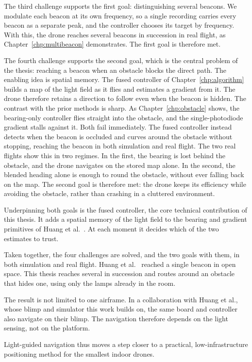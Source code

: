 The third challenge supports the first goal: distinguishing several beacons. We modulate each beacon at its own frequency, so a single recording carries every beacon as a separate peak, and the controller chooses its target by frequency. With this, the drone reaches several beacons in succession in real flight, as Chapter~\ref{chp:multibeacon} demonstrates. The first goal is therefore met.

The fourth challenge supports the second goal, which is the central problem of the thesis: reaching a beacon when an obstacle blocks the direct path. The enabling idea is spatial memory. The fused controller of Chapter~\ref{chp:algorithm} builds a map of the light field as it flies and estimates a gradient from it. The drone therefore retains a direction to follow even when the beacon is hidden. The contrast with the prior methods is sharp. As Chapter~\ref{chp:obstacle} shows, the bearing-only controller flies straight into the obstacle, and the single-photodiode gradient stalls against it. Both fail immediately. The fused controller instead detects when the beacon is occluded and curves around the obstacle without stopping, reaching the beacon in both simulation and real flight. The two real flights show this in two regimes. In the first, the bearing is lost behind the obstacle, and the drone navigates on the stored map alone. In the second, the blended heading alone is enough to round the obstacle, without ever falling back on the map. The second goal is therefore met: the drone keeps its efficiency while avoiding the obstacle, rather than crashing in a cluttered environment.

Underpinning both goals is the fused controller, the core technical contribution of this thesis. It adds a spatial memory of the light field to the bearing and gradient primitives of Huang et al.~\cite{huang2026lta}. At each moment it decides which of the two estimates to trust.

Taken together, the four challenges are solved, and the two goals with them, in both simulation and real flight. Huang et al.~\cite{huang2026lta} reached a single beacon in open space. This thesis reaches several in succession and routes around an obstacle that hides one, using only the lamps already in the room.

The result is not limited to one airframe. In a collaboration with Huang et al., whose blimp and simulator this work builds on, the same board and controller also navigate on their blimp. The navigation therefore depends on the light sensing, not on the platform.

Light-guided navigation thus moves a step closer to a practical, low-infrastructure positioning method for the smallest indoor drones.


